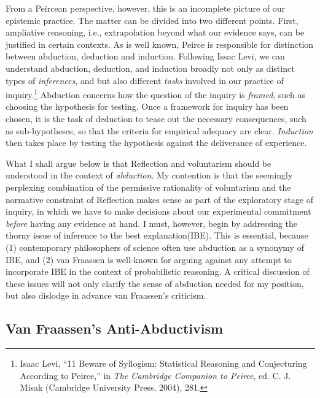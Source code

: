 From a Peircean perspective, however, this is an incomplete picture of
our epistemic practice. The matter can be divided into two different
points. First, ampliative reasoning, i.e., extrapolation beyond what our
evidence says, can be justified in certain contexts. As is well known,
Peirce is responsible for distinction between abduction, deduction and
induction. Following Issac Levi, we can understand abduction, deduction,
and induction broadly not only as distinct types of \emph{inferences},
and but also different \emph{tasks} involved in our practice of
inquiry.\footnote{Isaac Levi, ``11 Beware of Syllogism: Statistical
  Reasoning and Conjecturing According to Peirce,'' in \emph{The
  Cambridge Companion to Peirce}, ed. C. J. Misak (Cambridge University
  Press, 2004), 281.} Abduction concerns how the question of the inquiry
is \emph{framed}, such as choosing the hypothesis for testing. Once a
framework for inquiry has been chosen, it is the task of deduction to
tease out the necessary consequences, such as sub-hypotheses, so that
the criteria for empirical adequacy are clear. \emph{Induction} then
takes place by testing the hypothesis against the deliverance of
experience.

What I shall argue below is that Reflection and voluntarism should be
understood in the context of \emph{abduction}. My contention is that the
seemingly perplexing combination of the permissive rationality of
voluntarism and the normative constraint of Reflection makes sense as
part of the exploratory stage of inquiry, in which we have to make
decisions about our experimental commitment \emph{before} having any
evidence at hand. I must, however, begin by addressing the thorny issue
of inference to the best explanation(IBE). This is essential, because
(1) contemporary philosophers of science often use abduction as a
synonymy of IBE, and (2) van Fraassen is well-known for arguing against
any attempt to incorporate IBE in the context of probabilistic
reasoning. A critical discussion of these issues will not only clarify
the sense of abduction needed for my position, but also dislodge in
advance van Fraassen's criticism.

\hypertarget{van-fraassens-anti-abductivism}{%
\subsection{Van Fraassen's
Anti-Abductivism}\label{van-fraassens-anti-abductivism}}

